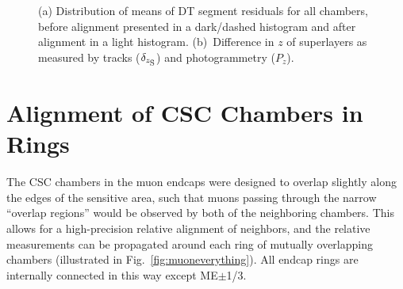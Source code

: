\begin{figure}
\centering
{}
\caption{(a) Distribution of means of DT segment residuals for all
chambers, before alignment presented in a dark/dashed histogram and
after alignment in a light histogram.  (b)~Difference in $z$ of
superlayers as measured by tracks ($\delta_{z_{\mbox{\scriptsize
S}}}$) and photogrammetry ($P_z$).}
\end{figure}

\section{Alignment of CSC Chambers in Rings}
\label{sec:localcsc}

The CSC chambers in the muon endcaps were designed to overlap slightly
along the edges of the sensitive area, such that muons passing through
the narrow ``overlap regions'' would be observed by both of the
neighboring chambers.  This allows for a high-precision relative
alignment of neighbors, and the relative measurements can be propagated
around each ring of mutually overlapping chambers (illustrated in
Fig.~\ref{fig:muoneverything}).  All endcap rings are internally
connected in this way except ME$\pm$1/3.


